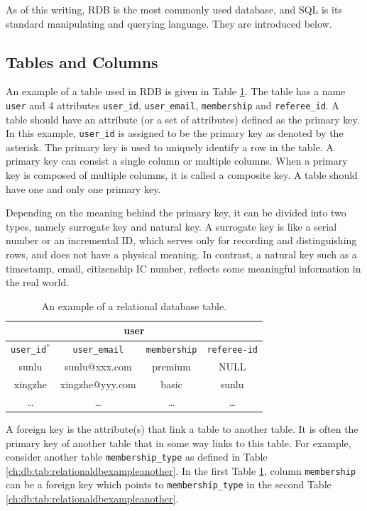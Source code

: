 As of this writing, RDB is the most commonly used database, and SQL is its standard manipulating and querying language. They are introduced below.

\subsection{Tables and Columns} \label{ch:db:subsec:tables}

An example of a table used in RDB is given in Table \ref{ch:db:tab:relationaldbexample}. The table has a name \verb|user| and 4 attributes \verb|user_id|, \verb|user_email|, \verb|membership| and \verb|referee_id|. A table should have an attribute (or a set of attributes) defined as the primary key. In this example, \verb|user_id| is assigned to be the primary key as denoted by the asterisk. The primary key is used to uniquely identify a row in the table. A primary key can consist a single column or multiple columns. When a primary key is composed of multiple columns, it is called a composite key. A table should have one and only one primary key.

Depending on the meaning behind the primary key, it can be divided into two types, namely surrogate key and natural key. A surrogate key is like a serial number or an incremental ID, which serves only for recording and distinguishing rows, and does not have a physical meaning. In contrast, a natural key such as a timestamp, email, citizenship IC number, reflects some meaningful information in the real world.

\begin{table}
	\centering \caption{An example of a relational database table.} \label{ch:db:tab:relationaldbexample}
	\begin{tabular}{|c|c|c|c|}
		\hline
        \multicolumn{4}{|c|}{user} \\ \hline
		\verb|user_id|$^*$ & \verb|user_email| & \verb|membership| & \verb|referee-id| \\ \hline
        sunlu & sunlu@xxx.com & premium & NULL \\ \hline
        xingzhe & xingzhe@yyy.com & basic & sunlu \\ \hline
        \ldots & \ldots & \ldots & \ldots \\ \hline
	\end{tabular}
\end{table}

A foreign key is the attribute(s) that link a table to another table. It is often the primary key of another table that in some way links to this table. For example, consider another table \verb|membership_type| as defined in Table \ref{ch:db:tab:relationaldbexampleanother}. In the first Table \ref{ch:db:tab:relationaldbexample}, column \verb|membership| can be a foreign key which points to \verb|membership_type| in the second Table \ref{ch:db:tab:relationaldbexampleanother}.


